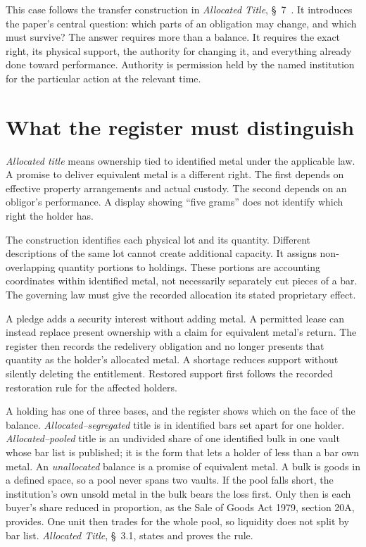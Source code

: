 \documentclass{momentum}
\begin{document}
This case follows the transfer construction in \emph{Allocated Title}, \S~7~\cite{allocated-title}. It introduces the paper's central question: which parts of an obligation may change, and which must survive? The answer requires more than a balance. It requires the exact right, its physical support, the authority for changing it, and everything already done toward performance. Authority is permission held by the named institution for the particular action at the relevant time.

\section{What the register must distinguish}

\emph{Allocated title} means ownership tied to identified metal under the applicable law. A promise to deliver equivalent metal is a different right. The first depends on effective property arrangements and actual custody. The second depends on an obligor's performance. A display showing ``five grams'' does not identify which right the holder has.

The construction identifies each physical lot and its quantity. Different descriptions of the same lot cannot create additional capacity. It assigns non-overlapping quantity portions to holdings. These portions are accounting coordinates within identified metal, not necessarily separately cut pieces of a bar. The governing law must give the recorded allocation its stated proprietary effect.

A pledge adds a security interest without adding metal. A permitted lease can instead replace present ownership with a claim for equivalent metal's return. The register then records the redelivery obligation and no longer presents that quantity as the holder's allocated metal. A shortage reduces support without silently deleting the entitlement. Restored support first follows the recorded restoration rule for the affected holders.

A holding has one of three bases, and the register shows which on the face of the balance. \emph{Allocated--segregated} title is in identified bars set apart for one holder. \emph{Allocated--pooled} title is an undivided share of one identified bulk in one vault whose bar list is published; it is the form that lets a holder of less than a bar own metal. An \emph{unallocated} balance is a promise of equivalent metal. A bulk is goods in a defined space, so a pool never spans two vaults. If the pool falls short, the institution's own unsold metal in the bulk bears the loss first. Only then is each buyer's share reduced in proportion, as the Sale of Goods Act 1979, section 20A, provides. One unit then trades for the whole pool, so liquidity does not split by bar list. \emph{Allocated Title}, \S~3.1, states and proves the rule.
\end{document}
